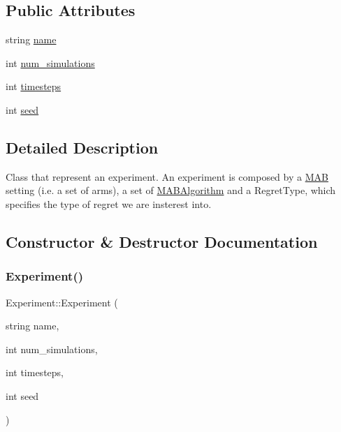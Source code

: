 \subsection*{Public Attributes}
\begin{DoxyCompactItemize}
\item 
string \mbox{\hyperlink{class_experiment_a2e451e5a87839f29986a54bf69715a79}{name}}
\item 
int \mbox{\hyperlink{class_experiment_ad95d4677faced6cf6b2d1f037f07901a}{num\+\_\+simulations}}
\item 
int \mbox{\hyperlink{class_experiment_a380452065b55d8e50a95b4f3608a80ca}{timesteps}}
\item 
int \mbox{\hyperlink{class_experiment_a5afc2955f4e99280fe0f4e8023582aec}{seed}}
\end{DoxyCompactItemize}


\subsection{Detailed Description}
Class that represent an experiment. An experiment is composed by a \mbox{\hyperlink{class_m_a_b}{M\+AB}} setting (i.\+e. a set of arms), a set of \mbox{\hyperlink{class_m_a_b_algorithm}{M\+A\+B\+Algorithm}} and a Regret\+Type, which specifies the type of regret we are insterest into. 

\subsection{Constructor \& Destructor Documentation}
\mbox{\label{class_experiment_ac89f5aa94daeec555004535271d36a17}} 
\subsubsection{\texorpdfstring{Experiment()}{Experiment()}}
{\footnotesize\ttfamily Experiment\+::\+Experiment (\begin{DoxyParamCaption}\item[{string}]{name,  }\item[{int}]{num\+\_\+simulations,  }\item[{int}]{timesteps,  }\item[{int}]{seed }\end{DoxyParamCaption})}



